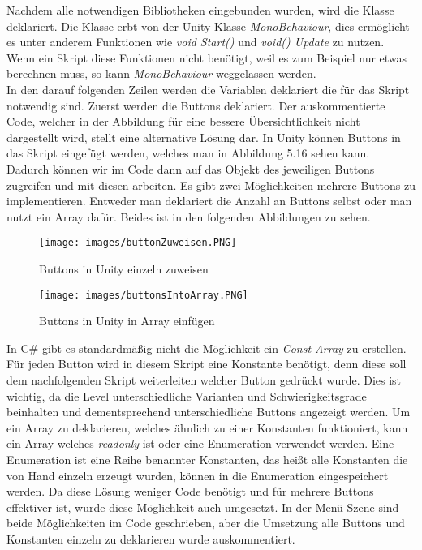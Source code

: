 Nachdem alle notwendigen Bibliotheken eingebunden wurden, wird die Klasse deklariert. Die Klasse erbt von der Unity-Klasse \textit{MonoBehaviour}, dies ermöglicht es unter anderem Funktionen wie \textit{void Start()} und \textit{void() Update} zu nutzen. Wenn ein Skript diese Funktionen nicht benötigt, weil es zum Beispiel nur etwas berechnen muss, so kann \textit{MonoBehaviour} weggelassen werden.\\
In den darauf folgenden Zeilen werden die Variablen deklariert die für das Skript notwendig sind. Zuerst werden die Buttons deklariert. Der auskommentierte Code, welcher in der Abbildung für eine bessere Übersichtlichkeit nicht dargestellt wird, stellt eine alternative Lösung dar. In Unity können Buttons in das Skript eingefügt werden, welches man in Abbildung 5.16 sehen kann. Dadurch können wir im Code dann auf das Objekt des jeweiligen Buttons zugreifen und mit diesen arbeiten. Es gibt zwei Möglichkeiten mehrere Buttons zu implementieren. Entweder man deklariert die Anzahl an Buttons selbst oder man nutzt ein Array dafür. Beides ist in den folgenden Abbildungen zu sehen.
\begin{figure}[htbp]
  \centering
  \texttt{[image: images/buttonZuweisen.PNG]}
  \caption{Buttons in Unity einzeln zuweisen}
  \label{singleButtonUnity}
\end{figure}
\begin{figure}[htbp]
  \centering
  \texttt{[image: images/buttonsIntoArray.PNG]}
  \caption{Buttons in Unity in Array einfügen}
  \label{arrayButtonUnity}
\end{figure}
In C\# gibt es standardmäßig nicht die Möglichkeit ein \textit{Const Array} zu erstellen. Für jeden Button wird in diesem Skript eine Konstante benötigt, denn diese soll dem nachfolgenden Skript weiterleiten welcher Button gedrückt wurde. Dies ist wichtig, da die Level unterschiedliche Varianten und Schwierigkeitsgrade beinhalten und dementsprechend unterschiedliche Buttons angezeigt werden. Um ein Array zu deklarieren, welches ähnlich zu einer Konstanten funktioniert, kann ein Array welches \textit{readonly} ist oder eine Enumeration verwendet werden. Eine Enumeration ist eine Reihe benannter Konstanten, das heißt alle Konstanten die von Hand einzeln erzeugt wurden, können in die Enumeration eingespeichert werden. Da diese Lösung weniger Code benötigt und für mehrere Buttons effektiver ist, wurde diese Möglichkeit auch umgesetzt. In der Menü-Szene sind beide Möglichkeiten im Code geschrieben, aber die Umsetzung alle Buttons und Konstanten einzeln zu deklarieren wurde auskommentiert.\\
